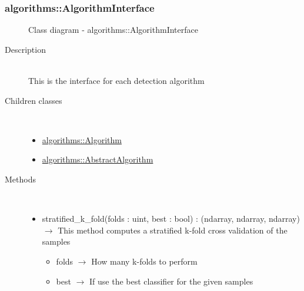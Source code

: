 \subsubsection[AlgorithmInterface]{algorithms::AlgorithmInterface}
\begin{figure}[h]
\centering
{}
\caption{Class diagram - algorithms::AlgorithmInterface}
\end{figure}\begin{description}
\item[Description] \hfill \\
 This is the interface for each detection algorithm
\item[Children classes] \hfill \\
 \vspace{-1cm}
\begin{itemize}
\item \hyperlink{algorithms::Algorithm}{algorithms::Algorithm}
\item \hyperlink{algorithms::AbstractAlgorithm}{algorithms::AbstractAlgorithm}
\end{itemize}

\item[Methods] \hfill \\
 \vspace{-1cm}
\begin{itemize}
\item stratified\_k\_fold(folds : uint, best : bool) : (ndarray, ndarray, ndarray) $\rightarrow$ This method computes a stratified k-fold cross validation of the samples\begin{itemize}
\item folds $\rightarrow$ How many k-folds to perform
\item best $\rightarrow$ If use the best classifier for the given samples
\end{itemize}

\end{itemize}

\end{description}
\hypertarget{algorithms::Algorithm}{}
